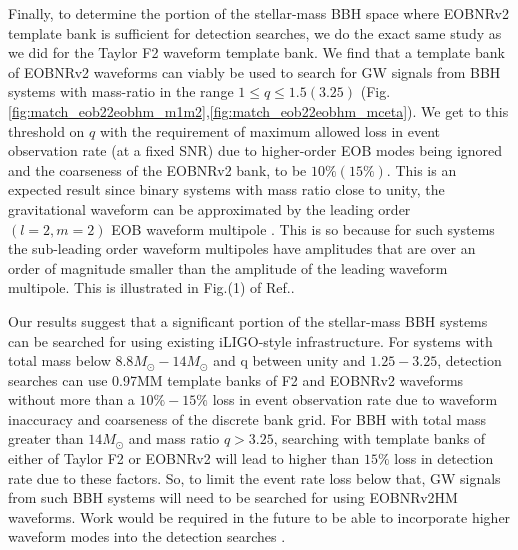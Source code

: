 \documentclass[aps,
prd,
amsmath,
amssymb,
twocolumn,
floatfix,
groupedaddress]{revtex4-1}
\newcommand{\MM}{\mathrm{MM}}
\begin{document}
Finally, to determine the portion of the stellar-mass BBH space where EOBNRv2 template bank is sufficient for detection searches, we do the exact same study as we did for the Taylor F2 waveform template bank. We find that a template bank of EOBNRv2 waveforms can viably be used to search for GW signals from BBH systems with mass-ratio in the range $1\leq q\leq 1.5 (3.25)$ (Fig.\ref{fig:match_eob22eobhm_m1m2},\ref{fig:match_eob22eobhm_mceta}). We get to this threshold on $q$ with the requirement of maximum allowed loss in event observation rate (at a fixed SNR) due to higher-order EOB modes being ignored and the coarseness of the EOBNRv2 bank, to be $10\% (15\%)$. This is an expected result since binary systems with mass ratio close to unity, the gravitational waveform can be approximated by the leading order $(l=2,m=2)$ EOB waveform multipole . This is so because for such systems the sub-leading order waveform multipoles have amplitudes that are over an order of magnitude smaller than the amplitude of the leading waveform multipole. This is illustrated in Fig.(1) of Ref.\citep{BuonannoEOBv2Main}.

Our results suggest that a significant portion of the stellar-mass BBH systems can be searched for using existing iLIGO-style infrastructure. For systems with total mass below $8.8M_{\odot}-14M_{\odot}$ and q between unity and $1.25-3.25$, detection searches can use 0.97$\MM$ template banks of F2 and EOBNRv2 waveforms without more than a $10\%-15\%$ loss in event observation rate due to waveform inaccuracy and coarseness of the discrete bank grid. For BBH with total mass greater than $14M_{\odot}$ and mass ratio $q> 3.25$, searching with template banks of either of Taylor F2 or EOBNRv2 will lead to higher than $15\%$ loss in detection rate due to these factors. So, to limit the event rate loss below that, GW signals from such BBH systems will need to be searched for using EOBNRv2HM waveforms. Work would be required in the future to be able to incorporate higher waveform modes into the detection searches \citep{HigherHarmonicsDAsearch}.


%
\end{document}
